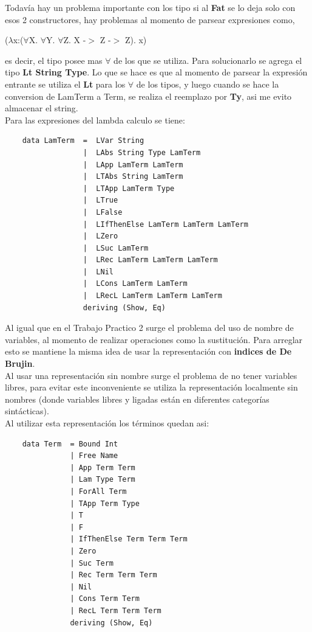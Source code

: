 \documentclass[12pt, titlepage, a4paper]{article}
\begin{document}
  Todavía hay un problema importante con los tipo si al \textbf{Fat} se lo deja solo con esos 2 constructores, hay problemas al momento de parsear 
  expresiones como,

  \begin{center}
    ($\lambda$x:($\forall$X. $\forall$Y. $\forall$Z. X -$>$ Z -$>$ Z). x)
  \end{center}  

  es decir, el tipo posee mas $\forall$ de los que se utiliza. Para solucionarlo se agrega el tipo \textbf{Lt String Type}. Lo que se hace es que 
  al momento de parsear la expresión entrante se utiliza el \textbf{Lt} para los $\forall$ de los tipos, y luego cuando se hace la conversion de 
  LamTerm a Term, se realiza el reemplazo por \textbf{Ty}, asi me evito almacenar el string.\\


\noindent Para las expresiones del lambda calculo se tiene:
\begin{verbatim}
    data LamTerm  =  LVar String
                  |  LAbs String Type LamTerm
                  |  LApp LamTerm LamTerm
                  |  LTAbs String LamTerm
                  |  LTApp LamTerm Type
                  |  LTrue 
                  |  LFalse
                  |  LIfThenElse LamTerm LamTerm LamTerm
                  |  LZero
                  |  LSuc LamTerm
                  |  LRec LamTerm LamTerm LamTerm
                  |  LNil
                  |  LCons LamTerm LamTerm
                  |  LRecL LamTerm LamTerm LamTerm
                  deriving (Show, Eq)
\end{verbatim}

Al igual que en el Trabajo Practico 2 \cite{tp2:lambdaCalculoSimpleTipado} surge el problema del uso de nombre de variables, al 
momento de realizar operaciones como la sustitución. Para arreglar esto se mantiene la misma idea de 
usar la representación con \textbf{indices de De Brujin}. \\

Al usar una representación sin nombre surge el problema de no tener variables libres,  
para evitar este inconveniente se utiliza la representación localmente sin nombres (donde variables libres y ligadas están 
en diferentes categorías sintácticas). \\

\noindent Al utilizar esta representación los términos quedan asi:
\begin{verbatim}
    data Term  = Bound Int
               | Free Name 
               | App Term Term
               | Lam Type Term
               | ForAll Term
               | TApp Term Type
               | T
               | F
               | IfThenElse Term Term Term
               | Zero
               | Suc Term
               | Rec Term Term Term
               | Nil
               | Cons Term Term
               | RecL Term Term Term
               deriving (Show, Eq)
\end{verbatim}
\end{document}
